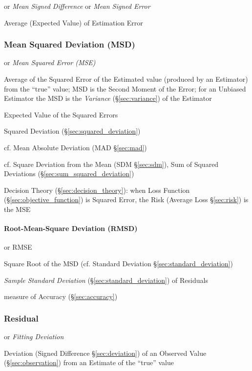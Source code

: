 or \emph{Mean Signed Difference} or \emph{Mean Signed Error}

Average (Expected Value) of Estimation Error



\subsubsection{Mean Squared Deviation (MSD)}\label{sec:msd}

or \emph{Mean Squared Error (MSE)}

Average of the Squared Error of the Estimated value (produced by an Estimator)
from the ``true'' value; MSD is the Second Moment of the Error; for an Unbiased
Estimator the MSD is the \emph{Variance} (\S\ref{sec:variance}) of the Estimator

Expected Value of the Squared Errors

Squared Deviation (\S\ref{sec:squared_deviation})

cf. Mean Absolute Deviation (MAD \S\ref{sec:mad})

cf. Square Deviation from the Mean (SDM \S\ref{sec:sdm}), Sum of Squared
Deviations (\S\ref{sec:sum_squared_deviation})

\fist Decision Theory (\S\ref{sec:decision_theory}): when Loss Function
(\S\ref{sec:objective_function}) is Squared Error, the Risk (Average Loss
\S\ref{sec:risk}) is the MSE



\paragraph{Root-Mean-Square Deviation (RMSD)}\label{sec:rmsd}\hfill

or RMSE

Square Root of the MSD (cf. Standard Deviation \S\ref{sec:standard_deviation})

\emph{Sample Standard Deviation} (\S\ref{sec:standard_deviation}) of Residuals

measure of Accuracy (\S\ref{sec:accuracy})



\subsubsection{Residual}\label{sec:residual}

or \emph{Fitting Deviation}

Deviation (Signed Difference \S\ref{sec:deviation}) of an Observed Value
(\S\ref{sec:observation}) from an Estimate of the ``true'' value

